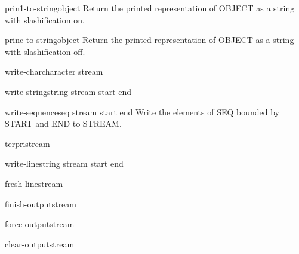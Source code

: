 \documentclass[10pt,english]{book}
\begin{document}
\begin{function}{prin1-to-string}{object}
  Return the printed representation of OBJECT as a string with
   slashification on.
\end{function}

\begin{function}{princ-to-string}{object}
  Return the printed representation of OBJECT as a string with
  slashification off.
\end{function}

\begin{function}{write-char}{character \op stream}
  
\end{function}

\begin{function}{write-string}{string \op stream \key start end}
  
\end{function}

\begin{function}{write-sequence}{seq stream \key start end}
  Write the elements of SEQ bounded by START and END to STREAM.
\end{function}

\begin{function}{terpri}{\op stream}
  
\end{function}

\begin{function}{write-line}{string \op stream \key start end}
  
\end{function}

\begin{function}{fresh-line}{\op stream}
  
\end{function}

\begin{function}{finish-output}{\op stream}
  
\end{function}

\begin{function}{force-output}{\op stream}
  
\end{function}

\begin{function}{clear-output}{\op stream}
  
\end{function}
\end{document}
